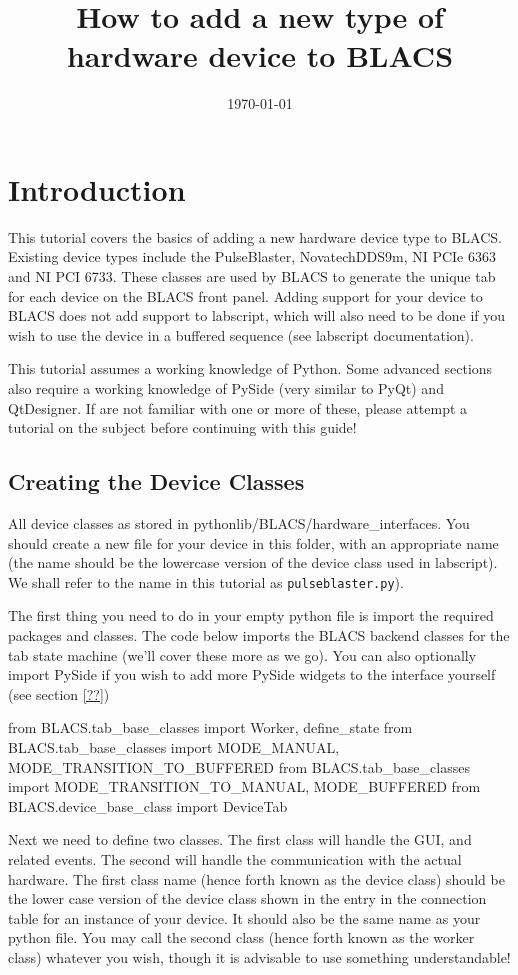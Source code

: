 \documentclass[12pt]{article}
\begin{document}
\title{How to add a new type of hardware device to BLACS}
\date{\today}
\maketitle
{}
\section{Introduction}
This tutorial covers the basics of adding a new hardware device type to BLACS. 
Existing device types include the PulseBlaster, NovatechDDS9m, NI PCIe 6363 and NI PCI 6733. 
These classes are used by BLACS to generate the unique tab for each device on the BLACS front panel. 
Adding support for your device to BLACS does not add support to labscript, which will also need to be done if you wish to use the device in a buffered sequence (see labscript documentation). 

This tutorial assumes a working knowledge of Python. 
Some advanced sections also require a working knowledge of PySide (very similar to PyQt) and QtDesigner. 
If are not familiar with one or more of these, please attempt a tutorial on the subject before continuing with this guide!

\subsection{Creating the Device Classes}\label{creating class}
All device classes as stored in pythonlib/BLACS/hardware\_interfaces. 
You should create a new file for your device in this folder, with an appropriate name (the name should be the lowercase version of the device class used in labscript). 
We shall refer to the name in this tutorial as \texttt{pulseblaster.py}).

The first thing you need to do in your empty python file is import the required packages and classes.
The code below imports the BLACS backend classes for the tab state machine (we'll cover these more as we go).
You can also optionally import PySide if you wish to add more PySide widgets to the interface yourself (see section \ref{??})
\begin{python}
from BLACS.tab_base_classes import Worker, define_state
from BLACS.tab_base_classes import MODE_MANUAL, MODE_TRANSITION_TO_BUFFERED
from BLACS.tab_base_classes import MODE_TRANSITION_TO_MANUAL, MODE_BUFFERED  
from BLACS.device_base_class import DeviceTab
\end{python}

Next we need to define two classes. 
The first class will handle the GUI, and related events. 
The second will handle the communication with the actual hardware. 
The first class name (hence forth known as the device class) should be the lower case version of the device class shown in the entry in the connection table for an instance of your device. 
It should also be the same name as your python file. 
You may call the second class (hence forth known as the worker class) whatever you wish, though it is advisable to use something understandable!
\end{document}
